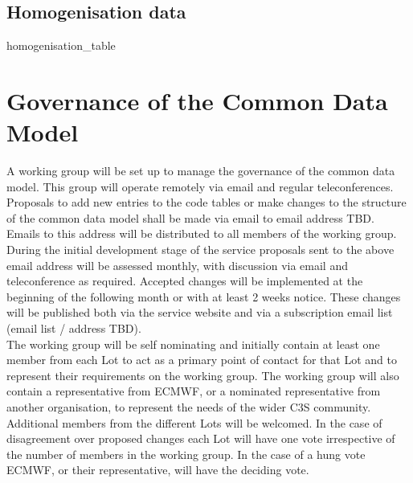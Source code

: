 \documentclass[a4paper,11pt]{article}
\begin{document}
\subsection {Homogenisation data}
 {homogenisation_table}


\section {Governance of the Common Data Model}
A working group will be set up to manage the governance of the common data model. This group will operate remotely via email and regular teleconferences.  Proposals to add new entries to the code tables or make changes to the structure of the common data model shall be made via email to email address TBD. Emails to this address will be distributed to all members of the working group. \\

During the initial development stage of the service proposals sent to the above email address will be assessed monthly, with discussion via email and teleconference as required. Accepted changes will be implemented at the beginning of the following month or with at least 2 weeks notice. These changes will be published both via the service website and via a subscription email list (email list / address TBD).\\

The working group will be self nominating and initially contain at least one member from each Lot to act as a primary point of contact for that Lot and to represent their requirements on the working group. The working group will also contain a representative from ECMWF, or a nominated representative from another organisation, to represent the needs of the wider C3S community. Additional members from the different Lots will be welcomed. In the case of disagreement over proposed changes each Lot will have one vote irrespective of the number of members in the working group. In the case of a hung vote ECMWF, or their representative, will have the deciding vote.\\
\end{document}
